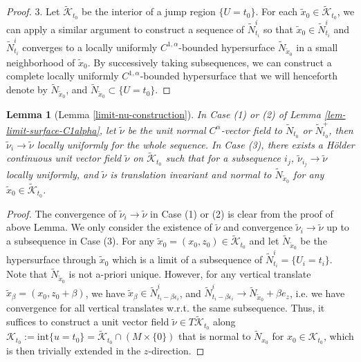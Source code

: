 \documentclass[11pt, letterpaper]{amsart}
\newtheorem{lem}[thm]{Lemma}
\theoremstyle{definition}
\theoremstyle{remark}
\begin{document}
\begin{appendix}
\begin{proof}
	3. Let $\tilde{\mathcal{K}}_{t_0}$ be the interior of a jump region $\{U= t_0\} $. For each $\tilde{x}_0 \in \tilde{\mathcal{K}}_{t_0}$, we can apply a similar argument to construct a sequence of $\tilde{N}^{i}_{t_i} $ so that $\tilde{x}_0 \in \tilde{N}^{i}_{t_i}$ and $\tilde{N}^{i}_{t_i}$ converges to a locally uniformly $C^{1,\alpha }$-bounded hypersurface $\tilde{N}_{\tilde{x}_0}$ in a small neighborhood of $\tilde{x}_0$. By successively taking subsequences, we can construct a complete locally uniformly $C^{1,\alpha }$-bounded hypersurface that we will henceforth denote by $\tilde{N}_{\tilde{x}_0}$, and $\tilde{N}_{\tilde{x}_0} \subset \{U = t_0\} $.
\end{proof}

\begin{lem}[Lemma \ref{limit-nu-construction}]
	In Case (1) or (2) of Lemma \ref{lem-limit-surface-C1alpha}, let $\tilde{\nu }$ be the unit normal $C^{\alpha }$-vector field to $\tilde{N}_{t_0}$ or $\tilde{N}_{t_0}^{+}$, then $\tilde{\nu }_i \to \tilde{\nu }$ locally uniformly for the whole sequence. In Case (3), there exists a H\"older continuous unit vector field $\tilde{\nu }$ on $\tilde{\mathcal{K}}_{t_0}$ such that for a subsequence $i_j$, $\tilde{\nu }_{i_j} \to \tilde{\nu }$ locally uniformly, and $\tilde{\nu }$ is translation invariant and normal to $\tilde{N}_{\tilde{x}_0}$ for any $\tilde{x}_0 \in \tilde{\mathcal{K}}_{t_0}$.
\end{lem}
\begin{proof}
The convergence of $\tilde{\nu }_i \to \tilde{\nu }$ in Case (1) or (2) is clear from the proof of above Lemma. We only consider the existence of $\tilde{\nu }$ and convergence $\tilde{\nu }_i \to \tilde{\nu }$ up to a subsequence in Case (3). For any $\tilde{x}_0= (x_0, z_0) \in \tilde{\mathcal{K}}_{t_0}$ and let $\tilde{N}_{\tilde{x}_0}$ be the hypersurface through $\tilde{x}_0$ which is a limit of a subsequence of $\tilde{N}^{i}_{t_i}=\{U_i = t_i\} $. Note that $\tilde{N}_{\tilde{x}_0}$ is not a-priori unique. However, for any vertical translate $\tilde{x}_{\beta }= (x_0, z_0+ \beta )$, we have $\tilde{x}_{\beta } \in \tilde{N}^{i}_{t_i - \beta \epsilon _i}$, and $ \tilde{N}^{i}_{t_i - \beta \epsilon _i} \to \tilde{N}_{\tilde{x}_0} + \beta e_{z} $, i.e. we have convergence for all vertical translates w.r.t. the same subsequence. Thus, it suffices to construct a unit vector field $\tilde{\nu } \in T \tilde{\mathcal{K}}_{t_0}$ along $\mathcal{K}_{t_0}:=\mathrm{int} \{u=t_0\} = \tilde{\mathcal{K}}_{t_0} \cap (M \times \{0\} )$ that is normal to $\tilde{N}_{x_0}$ for $x_0 \in \mathcal{K}_{t_0}$, which is then trivially extended in the $z$-direction.


\end{proof}
\end{appendix}
\end{document}
